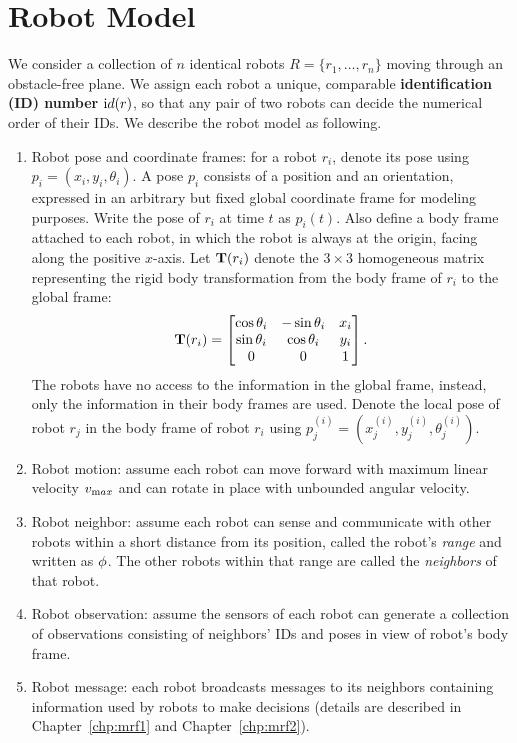 \section{Robot Model}
\label{sec:robot-model}
We consider a collection of $n$ identical robots $R = \{r_1, \ldots, r_n \}$ moving through an obstacle-free plane. 
%
We assign each robot a unique, comparable \textbf{identification (ID) number} ${\textrm id}(r)$, 
so that any pair of two robots can decide the numerical order of their IDs.
%
We describe the robot model as following.
\begin{enumerate}
\item Robot pose and coordinate frames: for a robot $r_i$, denote its pose using
  $p_i = (x_i, y_i, \theta_i)$. A pose $p_i$ consists of a position and an
  orientation, expressed in an arbitrary but fixed global coordinate frame for
  modeling purposes. Write the pose of $r_i$ at time $t$ as $p_i(t)$.  Also
  define a body frame attached to each robot, in which the robot is always at
  the origin, facing along the positive $x$-axis.  Let $\mathbf{T}(r_i)$ denote the $3
  \times 3$ homogeneous matrix representing the rigid body transformation from
  the body frame of $r_i$ to the global frame:
  \begin{equation}
    \label{eq:trans}
    \mathbf{T}(r_i) =  \begin{bmatrix}
      \cos{\theta_i} & - \sin{\theta_i} & x_i\\
      \sin{\theta_i} & \cos{\theta_i} & y_i \\
      0 & 0 & 1\\
    \end{bmatrix}.
  \end{equation}
  The robots have no access to the information in the global frame,
  instead, only the information in their body frames are used. 
  Denote the local pose of robot $r_j$ in the body frame of robot $r_i$ using
  $p_j^{(i)} = (x_j^{(i)}, y_j^{(i)}, \theta_j^{(i)})$.
\item Robot motion: assume each robot can move forward with maximum
  linear velocity $v_{\textrm max}$ and can rotate in place with unbounded
  angular velocity.
\item Robot neighbor: assume each robot can sense and
  communicate with other robots within a short distance from its
  position, called the robot's \textit{range} and written as $\phi$.
  The other robots within that range are called the \textit{neighbors}
  of that robot.
\item Robot observation: assume the sensors of each robot can generate
  a collection of observations consisting of neighbors' IDs and poses
  in view of robot's body frame.
\item Robot message: each robot broadcasts messages to its neighbors
  containing information used by robots to make decisions (details are
  described in Chapter~\ref{chp:mrf1} and Chapter~\ref{chp:mrf2}). 
\end{enumerate}

